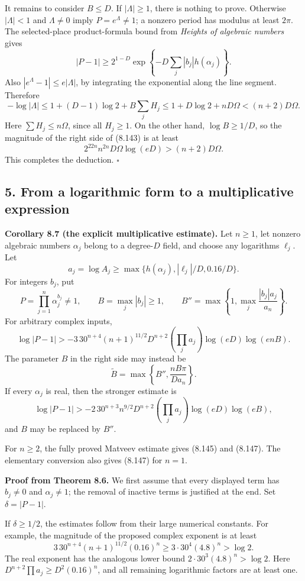 \documentclass[
  11pt,
  a4paper,
]{article}
\begin{document}
It remains to consider \(B\le D\). If \(|\Lambda|\ge1\), there is
nothing to prove. Otherwise \(|\Lambda|<1\) and \(\Lambda\ne0\) imply
\(P=e^\Lambda\ne1\); a nonzero period has modulus at least \(2\pi\). The
selected-place product-formula bound from \emph{Heights of algebraic
numbers} gives \[
|P-1|\ge2^{1-D}
\exp\left\{-D\sum_j|b_j|h(\alpha_j)\right\}.
\] Also \(|e^\Lambda-1|\le e|\Lambda|\), by integrating the exponential
along the line segment. Therefore \[
-\log|\Lambda|
\le1+(D-1)\log2+B\sum_jH_j
\le1+D\log2+nD\Omega<(n+2)D\Omega.
\] Here \(\sum H_j\le n\Omega\), since all \(H_j\ge1\). On the other
hand, \(\log B\ge1/D\), so the magnitude of the right side of (8.143) is
at least \[
2^{22n}n^{2n}D\Omega\log(eD)>(n+2)D\Omega.
\] This completes the deduction. \(\square\)

\subsection{5. From a logarithmic form to a multiplicative
expression}\label{from-a-logarithmic-form-to-a-multiplicative-expression}

\textbf{Corollary 8.7 (the explicit multiplicative estimate).} Let
\(n\ge1\), let nonzero algebraic numbers \(\alpha_j\) belong to a
degree-\(D\) field, and choose any logarithms \(\ell_j\). Let \[
a_j=\log A_j\ge
\max\{h(\alpha_j),|\ell_j|/D,0.16/D\}.
\] For integers \(b_j\), put \[
P=\prod_{j=1}^n\alpha_j^{b_j}\ne1,\qquad
B=\max_j|b_j|\ge1,\qquad
B''=\max\left\{1,\max_j\frac{|b_j|a_j}{a_n}\right\}.
\] For arbitrary complex inputs, \[
\log|P-1|>
-3\,30^{n+4}(n+1)^{11/2}D^{n+2}
\left(\prod_j a_j\right)\log(eD)\log(enB). \tag{8.145}
\] The parameter \(B\) in the right side may instead be \[
\widetilde B=\max\left\{B'',\frac{nB\pi}{D a_n}\right\}. \tag{8.146}
\] If every \(\alpha_j\) is real, then the stronger estimate is \[
\log|P-1|>
-2\,30^{n+3}n^{9/2}D^{n+2}
\left(\prod_j a_j\right)\log(eD)\log(eB), \tag{8.147}
\] and \(B\) may be replaced by \(B''\).

For \(n\ge2\), the fully proved Matveev estimate gives (8.145) and
(8.147). The elementary conversion also gives (8.147) for \(n=1\).

\textbf{Proof from Theorem 8.6.} We first assume that every displayed
term has \(b_j\ne0\) and \(\alpha_j\ne1\); the removal of inactive terms
is justified at the end. Set \(\delta=|P-1|\).

If \(\delta\ge1/2\), the estimates follow from their large numerical
constants. For example, the magnitude of the proposed complex exponent
is at least \[
3\,30^{n+4}(n+1)^{11/2}(0.16)^n
\ge3\cdot30^4(4.8)^n>\log2.
\] The real exponent has the analogous lower bound
\(2\cdot30^3(4.8)^n>\log2\). Here \(D^{n+2}\prod a_j\ge D^2(0.16)^n\),
and all remaining logarithmic factors are at least one.
\end{document}
